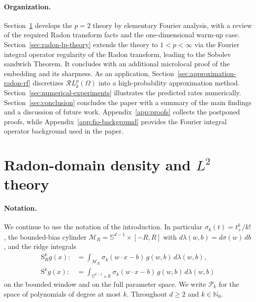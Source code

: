 \documentclass[12pt]{article}
\numberwithin{equation}{section}
\numberwithin{figure}{section}
\numberwithin{equation}{section}
\newcommand{\R}{\mathbb{R}}
\newcommand{\N}{\mathbb{N}}
\newcommand{\Sph}{\mathbb S}
\newcommand{\MR}{\mathcal M_R}
\begin{document}
\paragraph{Organization.}
Section~\ref{sec:radon-bv-sobolev} develops the $p=2$ theory by elementary Fourier analysis, with a review of the required Radon transform facts and the one-dimensional warm-up case.
Section~\ref{sec:radon-lp-theory} extends the theory to $1<p<\infty$ via
the Fourier integral operator regularity of the Radon transform, leading to the
Sobolev sandwich Theorem. It concludes with an additional microlocal proof of the
embedding and its sharpness.
As an application, Section~\ref{sec:approximation-radon-rf} discretizes
$\mathcal{R}L^p_k(\Omega)$ into a high-probability approximation method.
Section~\ref{sec:numerical-experiments} illustrates the predicted rates
numerically.
Section~\ref{sec:conclusion} concludes the paper with a summary of the 
main findings and a discussion of future work.
Appendix~\ref{app:proofs} collects the postponed proofs, while
Appendix~\ref{app:fio-background} provides the Fourier integral operator
background used in the paper.



\section{Radon-domain density and \texorpdfstring{$L^2$}{L2} theory}
\label{sec:radon-bv-sobolev}

\paragraph{Notation.}
We continue to use the notation of the introduction. In particular
$\sigma_k(t)=t_+^k/k!$, the bounded-bias
cylinder $\MR=\Sph^{d-1}\times[-R,R]$ with $d\lambda(w,b)=d\sigma(w)\,db$, and
the ridge integrals
\begin{align}
    \mathrm{S}^k_R g(x):&=\int_{\MR}\sigma_k(w\cdot x-b)\,g(w,b)\,d\lambda(w,b),\\
    \mathrm{S}^k g(x):&=\int_{\Sph^{d-1}\times\R}\sigma_k(w\cdot x-b)\,g(w,b)\,d\lambda(w,b)
    \label{eq:AR-Sk-recall}
\end{align}
on the bounded window and on the full parameter space.
We write $\mathcal{P}_k$ for the space of polynomials of degree at most $k$.
Throughout $d\ge2$ and $k\in\N_0$. 
\end{document}

